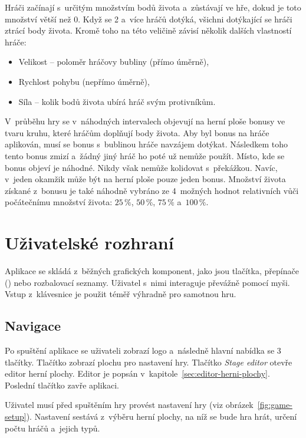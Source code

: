 Hráči začínají s~určitým množstvím bodů života a~zůstávají ve hře, dokud je toto množství větší než 0. Když se 2 a~více hráčů dotýká, všichni dotýkající se hráči ztrácí body života. Kromě toho na této veličině závisí několik dalších vlastností hráče:
\begin{itemize}
    \item Velikost -- poloměr hráčovy bubliny (přímo úměrně),
    \item Rychlost pohybu (nepřímo úměrně),
    \item Síla -- kolik bodů života ubírá hráč svým protivníkům.
\end{itemize}

V~průběhu hry se v~náhodných intervalech objevují na herní ploše bonusy ve tvaru kruhu, které hráčům doplňují body života. Aby byl bonus na hráče aplikován, musí se bonus s~bublinou hráče navzájem dotýkat. Následkem toho tento bonus zmizí a~žádný jiný hráč ho poté už nemůže použít. Místo, kde se bonus objeví je náhodné. Nikdy však nemůže kolidovat s~překážkou. Navíc, v~jeden okamžik může být na herní ploše pouze jeden bonus. Množství života získané z~bonusu je také náhodně vybráno ze 4~možných hodnot relativních vůči počátečnímu množství života: $25\,\%$, $50\,\%$, $75\,\%$ a~$100\,\%$.

\section{Uživatelské rozhraní}
\label{sec:uzivatelske-rozhrani}

Aplikace se skládá z~běžných grafických komponent, jako jsou tlačítka, přepínače () nebo rozbalovací seznamy. Uživatel s~nimi interaguje převážně pomocí myši. Vstup z~klávesnice je použit téměř výhradně pro samotnou hru.

\subsection*{Navigace}

Po spuštění aplikace se uživateli zobrazí logo a~následně hlavní nabídka se 3 tlačítky. Tlačítko  zobrazí plochu pro nastavení hry. Tlačítko \emph{Stage editor} otevře editor herní plochy. Editor je popsán v~kapitole~\ref{sec:editor-herni-plochy}. Poslední tlačítko  zavře aplikaci.

Uživatel musí před spuštěním hry provést nastavení hry (viz obrázek~\ref{fig:game-setup}). Nastavení sestává z~výběru herní plochy, na níž se bude hra hrát, určení počtu hráčů a~jejich typů.


